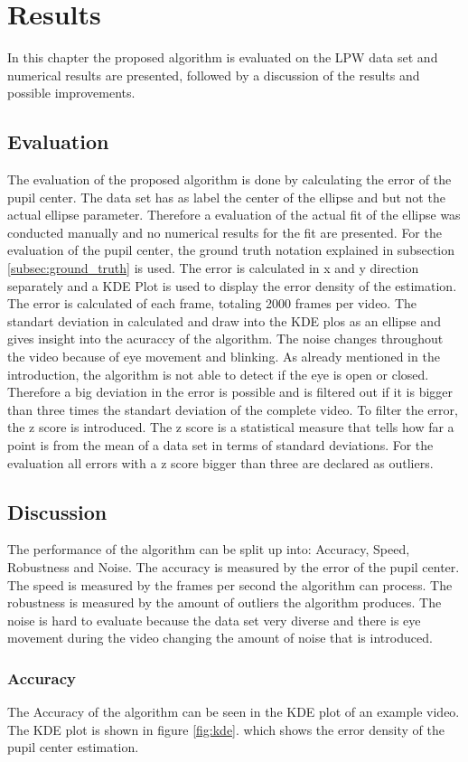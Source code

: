 \chapter{Results}
In this chapter the proposed algorithm is evaluated on the LPW data set and numerical results are presented, followed by a discussion of the results and possible improvements.
\section{Evaluation}
The evaluation of the proposed algorithm is done by calculating the error of the pupil center. The data set has as label the center of the ellipse and but not the actual ellipse parameter. Therefore a evaluation of the actual fit of the ellipse was conducted manually and no numerical results for the fit are presented. For the evaluation of the pupil center, the ground truth notation explained in subsection \ref{subsec:ground_truth} is used. The error is calculated in x and y direction separately and a KDE Plot is used to display the error density of the estimation. The error is calculated of each frame, totaling 2000 frames per video. The standart deviation in calculated and draw into the KDE plos as an ellipse and gives insight into the acuraccy of the algorithm. The noise changes throughout the video because of eye movement and blinking. As already mentioned in the introduction, the algorithm is not able to detect if the eye is open or closed. Therefore a big deviation in the error is possible and is filtered out if it is bigger than three times the standart deviation of the complete video. To filter the error, the z score is introduced. The z score is a statistical measure that tells how far a point is from the mean of a data set in terms of standard deviations. For the evaluation all errors with a z score bigger than three are declared as outliers. 

\section{Discussion}
The performance of the algorithm can be split up into: Accuracy, Speed, Robustness and Noise. The accuracy is measured by the error of the pupil center. The speed is measured by the frames per second the algorithm can process. The robustness is measured by the amount of outliers the algorithm produces. The noise is hard to evaluate because the data set very diverse and there is eye movement during the video changing the amount of noise that is introduced.
\subsection{Accuracy}
The Accuracy of the algorithm can be seen in the KDE plot of an example video. The KDE plot is shown in figure \ref{fig:kde}. which shows the error density of the pupil center estimation. 

